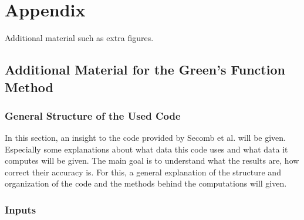 
\section{Appendix}
\label{s:Appendix}

Additional material such as extra figures.

\subsection{Additional Material for the Green's Function Method}

\subsubsection{General Structure of the Used Code}
\label{GreensCode}

In this section, an insight to the code provided by Secomb et al. \cite{Secomb2004} will be given. Especially some explanations about what data this code uses and what data it computes will be given. 
The main goal is to understand what the results are, how correct their accuracy is. For this, a general explanation of the structure and organization of the code and the methods behind the computations will given.

\subsubsection*{Inputs}
\label{Inputs}

